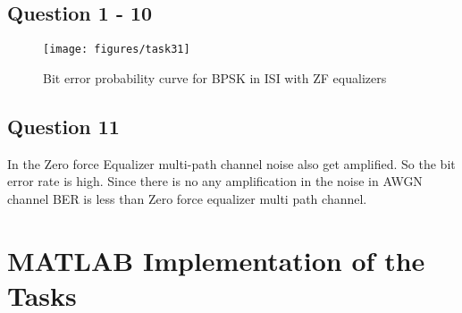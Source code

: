 \documentclass[a4paper,11pt]{article}%
\begin{document}
\subsection{Question 1 - 10}
\begin{figure}[H]
	\centering
	\texttt{[image: figures/task31]}
	\caption{Bit error probability curve for BPSK in ISI with ZF equalizers}
\end{figure}

\subsection{Question 11}
In the Zero force Equalizer multi-path channel noise also get amplified. So the bit error rate is high. Since there is no any amplification in the noise in AWGN channel BER is less than Zero force equalizer multi path channel.


	\section{MATLAB Implementation of the Tasks}
	

\end{document}

